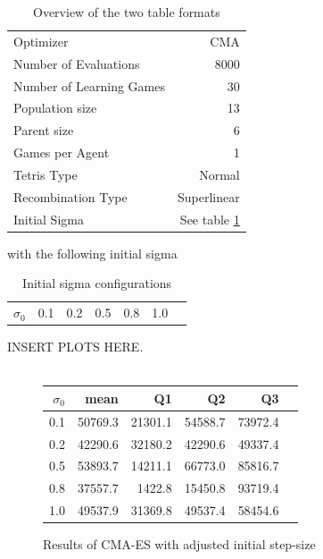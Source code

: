 \begin{table}[h]
\centering
\caption{Overview of the two table formats}
\begin{tabular}{l r}
Optimizer & CMA\\
Number of Evaluations & 8000\\
Number of Learning Games &30\\
Population size& 13\\
Parent size & 6\\
Games per Agent & 1\\
Tetris Type & Normal\\
\hline
Recombination Type & Superlinear\\
Initial Sigma & See table \ref{InitialSigmaTest}
\end{tabular}
\end{table}

with the following initial sigma

\begin{table}[H]
\centering
\begin{tabular}{c | c c c c c c}
$\sigma_0$ & 0.1 & 0.2 & 0.5 & 0.8 & 1.0
\end{tabular}
\caption{Initial sigma configurations \label{InitialSigmaTest}}
\end{table}

INSERT PLOTS HERE.\\
\\


\begin{figure}[H]
\centering
\begin{tabular}{r | r r r r r}
$\sigma_0$ & mean & Q1 & Q2 & Q3\\
\hline
0.1 & 50769.3 & 21301.1 & 54588.7 & 73972.4\\
0.2 & 42290.6 & 32180.2 & 42290.6 & 49337.4\\
0.5 & 53893.7 & 14211.1 & 66773.0 & 85816.7\\
0.8 & 37557.7 & 1422.8  & 15450.8 & 93719.4\\
1.0 & 49537.9 & 31369.8 & 49537.4 & 58454.6
\end{tabular}
\caption{Results of CMA-ES with adjusted initial step-size \label{CMAInitialSigmaConfigTestAppendix}}
\end{figure}

\clearpage

